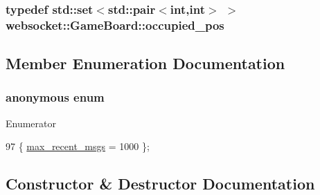 \subsubsection[{\texorpdfstring{occupied\+\_\+pos}{occupied_pos}}]{\setlength{\rightskip}{0pt plus 5cm}typedef std\+::set$<$std\+::pair$<$int,int$>$ $>$ {\bf websocket\+::\+Game\+Board\+::occupied\+\_\+pos}\hspace{0.3cm}{\ttfamily [private]}}\hypertarget{classwebsocket_1_1GameBoard_ab68a03a083cfa75e7d5b21fe0c13eda3}{}\label{classwebsocket_1_1GameBoard_ab68a03a083cfa75e7d5b21fe0c13eda3}


\subsection{Member Enumeration Documentation}
\subsubsection[{\texorpdfstring{anonymous enum}{anonymous enum}}]{\setlength{\rightskip}{0pt plus 5cm}anonymous enum\hspace{0.3cm}{\ttfamily [private]}}\hypertarget{classwebsocket_1_1GameBoard_a84b7265b5db0109546eeadc332b10254}{}\label{classwebsocket_1_1GameBoard_a84b7265b5db0109546eeadc332b10254}
\begin{Desc}
\item[Enumerator]\par
\begin{description}
\item[{\em 
max\+\_\+recent\+\_\+msgs\hypertarget{classwebsocket_1_1GameBoard_a84b7265b5db0109546eeadc332b10254a1a669a5c5c208eebeb228bd6cbe3611b}{}\label{classwebsocket_1_1GameBoard_a84b7265b5db0109546eeadc332b10254a1a669a5c5c208eebeb228bd6cbe3611b}
}]\end{description}
\end{Desc}

\begin{DoxyCode}
97 \{ \hyperlink{classwebsocket_1_1GameBoard_a84b7265b5db0109546eeadc332b10254a1a669a5c5c208eebeb228bd6cbe3611b}{max\_recent\_msgs} = 1000 \};
\end{DoxyCode}


\subsection{Constructor \& Destructor Documentation}
